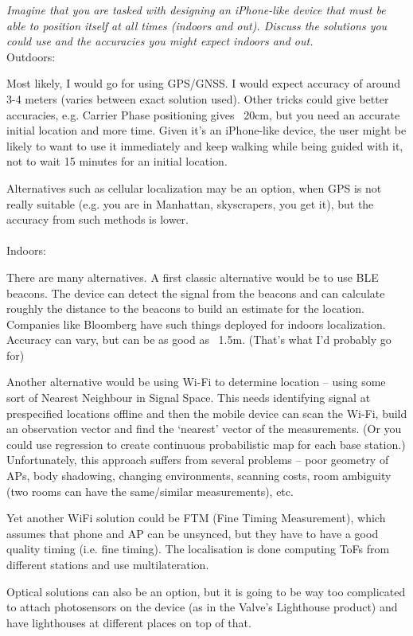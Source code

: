 \documentclass[12pt]{article}
\newcommand*\circled[1]{\tikz[baseline=(char.base)]{
		\node[shape=circle,draw,inner sep=0pt] (char) {#1};}}
\begin{document}
\textit{\circled{8.} Imagine that you are tasked with designing an iPhone-like
device that must be able to position itself at all times (indoors and out).
Discuss the solutions you could use and the accuracies you might expect indoors
and out.}
\\
Outdoors:

Most likely, I would go for using GPS/GNSS.  I would expect accuracy of around
3-4 meters (varies between exact solution used). Other tricks could give better
accuracies, e.g. Carrier Phase positioning gives ~20cm, but you need an
accurate initial location and more time. Given it's an iPhone-like device, the
user might be likely to want to use it immediately and keep walking while being
guided with it, not to wait 15 minutes for an initial location.

Alternatives such as cellular localization may be an option, when GPS is not
really suitable (e.g. you are in Manhattan, skyscrapers, you get it), but the
accuracy from such methods is lower.
\\
\\
Indoors:

There are many alternatives. A first classic alternative would be to use BLE
beacons.  The device can detect the signal from the beacons and can calculate
roughly the distance to the beacons to build an estimate for the location.
Companies like Bloomberg have such things deployed for indoors localization.
Accuracy can vary, but can be as good as ~1.5m. (That's what I'd probably go for)

Another alternative would be using Wi-Fi to determine location -- using some
sort of Nearest Neighbour in Signal Space. This needs identifying signal at
prespecified locations offline and then the mobile device can scan the Wi-Fi,
build an observation vector and find the `nearest' vector of the measurements.
(Or you could use regression to create continuous probabilistic map for each
base station.) Unfortunately, this approach suffers from several problems --
poor geometry of APs, body shadowing, changing environments, scanning costs,
room ambiguity (two rooms can have the same/similar measurements), etc.

Yet another WiFi solution could be FTM (Fine Timing Measurement), which assumes
that phone and AP can be unsynced, but they have to have a good quality timing
(i.e. fine timing). The localisation is done computing ToFs from different 
stations and use multilateration.

Optical solutions can also be an option, but it is going to be way too
complicated to attach photosensors on the device (as in the Valve's Lighthouse
product) and have lighthouses at different places on top of that.
\end{document}
